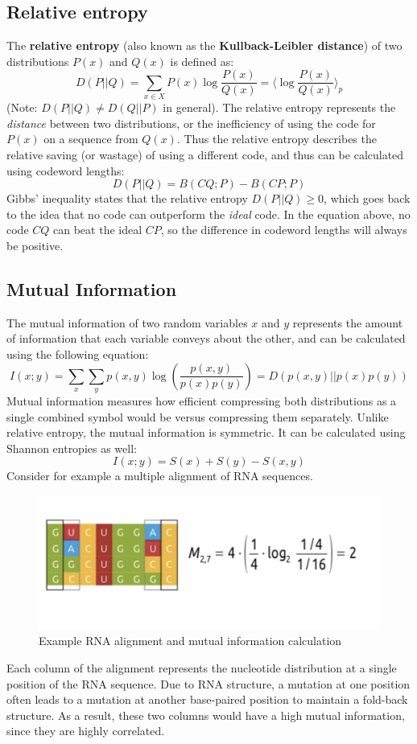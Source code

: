 \documentclass[12pt]{article}
\begin{document}
\subsection{Relative entropy}
The \textbf{relative entropy} (also known as the \textbf{Kullback-Leibler distance}) of two distributions $P(x)$ and $Q(x)$ is defined as:
$$D(P||Q) = \sum_{x\in X}P(x)\log\frac{P(x)}{Q(x)} = \langle\log\frac{P(x)}{Q(x)}\rangle_p$$
(Note: $D(P||Q) \neq D(Q||P)$ in general). The relative entropy represents the \textit{distance} between two distributions, or the inefficiency of using the code for $P(x)$ on a sequence from $Q(x)$. Thus the relative entropy describes the relative saving (or wastage) of using a different code, and thus can be calculated using codeword lengths:
$$D(P||Q) = B(CQ;P) - B(CP;P)$$
Gibbs' inequality states that the relative entropy $D(P||Q) \geq 0$, which goes back to the idea that no code can outperform the \textit{ideal} code. In the equation above, no code $CQ$ can beat the ideal $CP$, so the difference in codeword lengths will always be positive.
\subsection{Mutual Information}
The mutual information of two random variables $x$ and $y$ represents the amount of information that each variable conveys about the other, and can be calculated using the following equation:
$$I(x;y) = \sum_x\sum_yp(x,y)\log\left(\frac{p(x,y)}{p(x)p(y)}\right) = D(p(x,y)||p(x)p(y))$$
Mutual information measures how efficient compressing both distributions as a single combined symbol would be versus compressing them separately. Unlike relative entropy, the mutual information is symmetric. It can be calculated using Shannon entropies as well:
$$I(x;y) = S(x) + S(y) - S(x,y)$$
Consider for example a multiple alignment of RNA sequences. 
\begin{figure}[h]
    \centering
    \includegraphics[width = .7\linewidth]{mutual.png}
    \caption{Example RNA alignment and mutual information calculation}
    \label{fig:mutual}
\end{figure}
Each column of the alignment represents the nucleotide distribution at a single position of the RNA sequence. Due to RNA structure, a mutation at one position often leads to a mutation at another base-paired position to maintain a fold-back structure. As a result, these two columns would have a high mutual information, since they are highly correlated.
\end{document}
